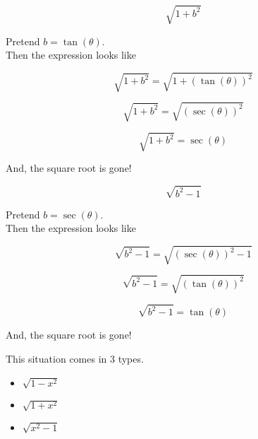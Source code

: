 \documentclass{ximera}
\begin{document}
\begin{example}


\[
\sqrt{1 + b^2} 
\]


Pretend $b = \tan(\theta)$. \\

Then the expression looks like

\[
\sqrt{1 + b^2} = \sqrt{1 + (\tan(\theta))^2}
\]


\[
\sqrt{1 + b^2} = \sqrt{(\sec(\theta))^2}
\]


\[
\sqrt{1 + b^2} = \sec(\theta)
\]



And, the square root is gone! \\





\end{example}
















\begin{example}


\[
\sqrt{b^2 - 1} 
\]


Pretend $b = \sec(\theta)$. \\

Then the expression looks like

\[
\sqrt{b^2 - 1} = \sqrt{(\sec(\theta))^2 - 1}
\]


\[
\sqrt{b^2 - 1} = \sqrt{(\tan(\theta))^2}
\]


\[
\sqrt{b^2  - 1} = \tan(\theta)
\]



And, the square root is gone! \\





\end{example}






This situation comes in 3 types.



\begin{itemize}
\item $\sqrt{1 - x^2}$
\item $\sqrt{1 + x^2}$
\item $\sqrt{x^2 - 1}$
\end{itemize}
\end{document}
